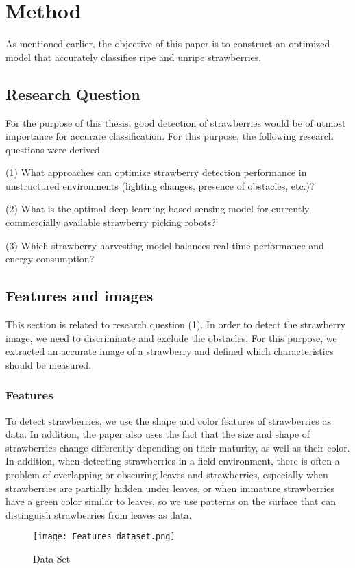 \documentclass{ws-ijprai}
\begin{document}
\section{Method}

As mentioned earlier, the objective of this paper is to construct an optimized model that accurately classifies ripe and unripe strawberries.

\subsection{Research Question}

For the purpose of this thesis, good detection of strawberries would be of utmost importance for accurate classification. For this purpose, the following research questions were derived 

(1) What approaches can optimize strawberry detection performance in unstructured environments (lighting changes, presence of obstacles, etc.)?

(2) What is the optimal deep learning-based sensing model for currently commercially available strawberry picking robots?

(3) Which strawberry harvesting model balances real-time performance and energy consumption?


\subsection{Features and images}

This section is related to research question (1). In order to detect the strawberry image, we need to discriminate and exclude the obstacles.  For this purpose, we extracted an accurate image of a strawberry and defined which characteristics should be measured.

\subsubsection{Features}

To detect strawberries, we use the shape and color features of strawberries as data. 
In addition, the paper also uses the fact that the size and shape of strawberries change differently depending on their maturity, as well as their color. 
In addition, when detecting strawberries in a field environment, there is often a problem of overlapping or obscuring leaves and strawberries, especially when strawberries are partially hidden under leaves, or when immature strawberries have a green color similar to leaves, so we use patterns on the surface that can distinguish strawberries from leaves as data.
\begin{figure}
    \centering
    \texttt{[image: Features\_dataset.png]}
    \caption{Data Set}
    \label{fig:enter-label}
\end{figure}
\end{document}
